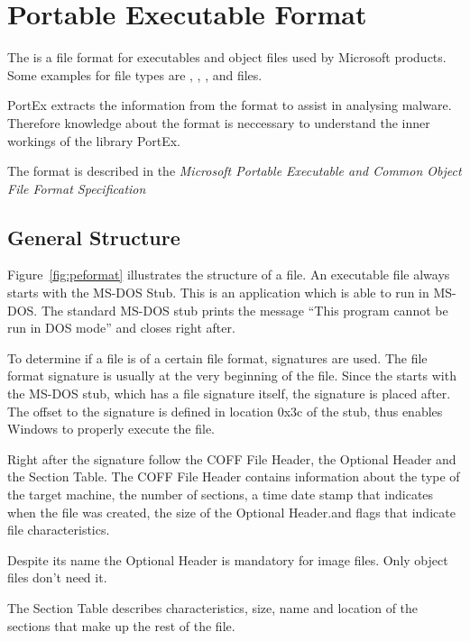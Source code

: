 \chapter{Portable Executable Format} \label{chap:peformat}

The \PE{} is a file format for executables and object files used by Microsoft products. Some examples for \PE{} file types are \DLL{}, \FON{}, \DRV{}, \SYS{} and \EXE{} files.

PortEx extracts the information from the \PE{} format to assist in analysing malware. Therefore knowledge about the \PE{} format is neccessary to understand the inner workings of the library PortEx.

The \PE{} format is described in the \emph{Microsoft Portable Executable and Common Object File Format Specification} \cite{pespec}

\section{General Structure}

Figure~\ref{fig:peformat} illustrates the structure of a \PE{} file. An executable \PE{} file always starts with the MS-DOS Stub. This is an application which is able to run in MS-DOS. The standard MS-DOS stub prints the message \enquote{This program cannot be run in DOS mode} and closes right after. 

To determine if a file is of a certain file format, signatures are used. The file format signature is usually at the very beginning of the file. Since the \PE{} starts with the MS-DOS stub, which has a file signature itself, the \PE{} signature is placed after.  The offset to the \PE{} signature is defined in location 0x3c of the stub, thus enables Windows to properly execute the \PE{} file. 

Right after the signature follow the COFF File Header, the Optional Header and the Section Table. The COFF File Header contains information about the type of the target machine, the number of sections, a time date stamp that indicates when the file was created, the size of the Optional Header.and flags that indicate file characteristics.

Despite its name the Optional Header is mandatory for image files. Only object files don't need it.

The Section Table describes \ia{} characteristics, size, name and location of the sections that make up the rest of the \PE{} file.

